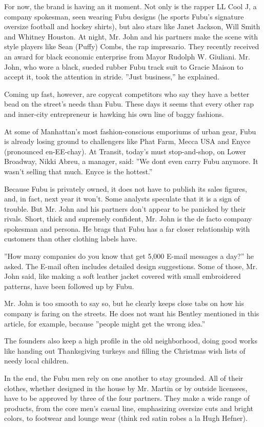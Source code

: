 For now, the brand is having an it moment. Not only is the rapper LL
Cool J, a company spokesman, seen wearing Fubu designs (he sports Fubu's
signature oversize football and hockey shirts), but also stars like
Janet Jackson, Will Smith and Whitney Houston. At night, Mr. John and
his partners make the scene with style players like Sean (Puffy) Combs,
the rap impresario. They recently received an award for black economic
enterprise from Mayor Rudolph W. Giuliani. Mr. John, who wore a black,
sueded rubber Fubu track suit to Gracie Maison to accept it, took the
attention in stride. ''Just business,'' he explained.

Coming up fast, however, are copycat competitors who say they have a
better bead on the street's needs than Fubu. These days it seems that
every other rap and inner-city entrepreneur is hawking his own line of
baggy fashions.

At some of Manhattan's most fashion-conscious emporiums of urban gear,
Fubu is already losing ground to challengers like Phat Farm, Mecca USA
and Enyce (pronounced en-EE-chay). At Transit, today's must
stop-and-shop, on Lower Broadway, Nikki Abreu, a manager, said: ''We
dont even carry Fubu anymore. It wasn't selling that much. Enyce is the
hottest.''

Because Fubu is privately owned, it does not have to publish its sales
figures, and, in fact, next year it won't. Some analysts speculate that
it is a sign of trouble. But Mr. John and his partners don't appear to
be panicked by their rivals. Short, thick and supremely confident, Mr.
John is the de facto company spokesman and persona. He brags that Fubu
has a far closer relationship with customers than other clothing labels
have.

''How many companies do you know that get 5,000 E-mail messages a day?''
he asked. The E-mail often includes detailed design suggestions. Some of
those, Mr. John said, like making a soft leather jacket covered with
small embroidered patterns, have been followed up by Fubu.

Mr. John is too smooth to say so, but he clearly keeps close tabs on how
his company is faring on the streets. He does not want his Bentley
mentioned in this article, for example, because ''people might get the
wrong idea.''

The founders also keep a high profile in the old neighborhood, doing
good works like handing out Thanksgiving turkeys and filling the
Christmas wish lists of needy local children.

In the end, the Fubu men rely on one another to stay grounded. All of
their clothes, whether designed in the house by Mr. Martin or by outside
licensees, have to be approved by three of the four partners. They make
a wide range of products, from the core men's casual line, emphasizing
oversize cuts and bright colors, to footwear and lounge wear (think red
satin robes a la Hugh Hefner).

